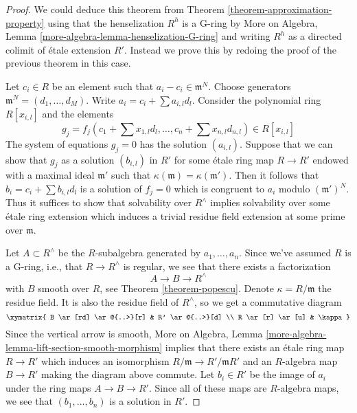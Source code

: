 \begin{proof}
We could deduce this theorem from Theorem \ref{theorem-approximation-property}
using that the henselization $R^h$ is a G-ring by
More on Algebra, Lemma \ref{more-algebra-lemma-henselization-G-ring}
and writing $R^h$ as a directed colimit of \'etale extension $R'$.
Instead we prove this by redoing the proof of the previous theorem
in this case.

\medskip\noindent
Let $c_i \in R$ be an element such that $a_i - c_i \in \mathfrak m^N$.
Choose generators $\mathfrak m^N = (d_1, \ldots, d_M)$.
Write $a_i = c_i + \sum a_{i, l} d_l$.
Consider the polynomial ring $R[x_{i, l}]$ and the elements
$$
g_j = f_j(c_1 + \sum x_{1, l} d_l , \ldots, c_n + \sum x_{n, l} d_{n, l})
\in R[x_{i, l}]
$$
The system of equations $g_j = 0$ has the solution $(a_{i, l})$.
Suppose that we can show that $g_j$ as a solution $(b_{i, l})$ in $R'$
for some \'etale ring map $R \to R'$ endowed with a maximal ideal
$\mathfrak m'$ such that $\kappa(\mathfrak m) = \kappa(\mathfrak m')$.
Then it follows that $b_i = c_i + \sum b_{i, l}d_l$ is a solution
of $f_j = 0$ which is congruent to $a_i$ modulo $(\mathfrak m')^N$.
Thus it suffices to show that solvability over $R^\wedge$ implies
solvability over some \'etale ring extension which induces a trivial
residue field extension at some prime over $\mathfrak m$.

\medskip\noindent
Let $A \subset R^\wedge$ be the $R$-subalgebra generated by
$a_1, \ldots, a_n$. Since we've assumed $R$ is a G-ring, i.e.,
that $R \to R^\wedge$ is regular, we see that
there exists a factorization
$$
A \to B \to R^\wedge
$$
with $B$ smooth over $R$, see Theorem \ref{theorem-popescu}.
Denote $\kappa = R/\mathfrak m$ the residue field. It is also
the residue field of $R^\wedge$, so we get a commutative diagram
$$
\xymatrix{
B \ar[rd] \ar@{..>}[r] & R' \ar@{..>}[d] \\
R \ar[r] \ar[u] & \kappa
}
$$
Since the vertical arrow is smooth,
More on Algebra, Lemma \ref{more-algebra-lemma-lift-section-smooth-morphism}
implies that there exists an \'etale ring map $R \to R'$
which induces an isomorphism $R/\mathfrak m \to R'/\mathfrak mR'$
and an $R$-algebra map $B \to R'$ making the diagram above commute.
Let $b_i \in R'$ be the image of $a_i$ under the ring maps
$A \to B \to R'$. Since all of these maps are $R$-algebra
maps, we see that $(b_1, \ldots, b_n)$ is a solution in $R'$.
\end{proof}













